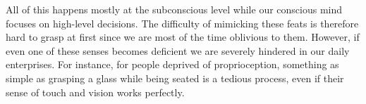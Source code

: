 All of this happens mostly at the subconscious level while our conscious mind focuses on high-level decisions.
The difficulty of mimicking these feats is therefore hard to grasp at first since we are most of the time oblivious to them.
However, if even one of these senses becomes deficient we are severely hindered in our daily enterprises. For instance, for people deprived
of proprioception, something as simple as grasping a glass while being seated is a tedious process, even if their sense of touch and vision works perfectly.









